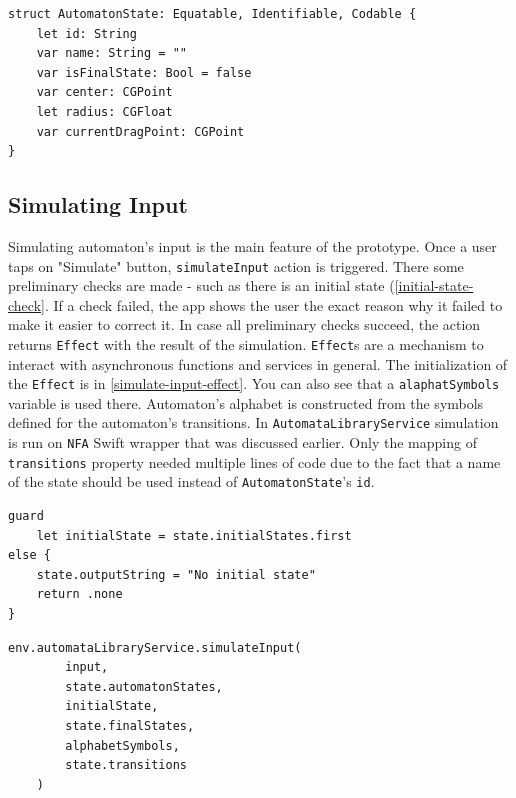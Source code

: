 \begin{lstlisting}[caption={State model}, label=state-model]
struct AutomatonState: Equatable, Identifiable, Codable {
    let id: String
    var name: String = ""
    var isFinalState: Bool = false
    var center: CGPoint
    let radius: CGFloat
    var currentDragPoint: CGPoint
}
\end{lstlisting}

\subsection{Simulating Input}

Simulating automaton's input is the main feature of the prototype. Once a user taps on "Simulate" button, \lstinline{simulateInput} action is triggered. There some preliminary checks are made - such as there is an initial state (\ref{initial-state-check}. If a check failed, the app shows the user the exact reason why it failed to make it easier to correct it. In case all preliminary checks succeed, the action returns \lstinline{Effect} with the result of the simulation. \lstinline{Effect}s are a mechanism to interact with asynchronous functions and services in general. The initialization of the \lstinline{Effect} is in \ref{simulate-input-effect}. You can also see that a \lstinline{alaphatSymbols} variable is used there. Automaton's alphabet is constructed from the symbols defined for the automaton's transitions. In \lstinline{AutomataLibraryService} simulation is run on \lstinline{NFA} Swift wrapper that was discussed earlier. Only the mapping of \lstinline{transitions} property needed multiple lines of code due to the fact that a name of the state should be used instead of \lstinline{AutomatonState}'s \lstinline{id}.

\begin{lstlisting}[caption={Check for initiail state}, label=initial-state-check]
guard
    let initialState = state.initialStates.first
else {
    state.outputString = "No initial state"
    return .none
}
\end{lstlisting}   

\begin{lstlisting}[caption={Effect for simulating input}, label=simulate-input-effect]
env.automataLibraryService.simulateInput(
        input,
        state.automatonStates,
        initialState,
        state.finalStates,
        alphabetSymbols,
        state.transitions
    )
\end{lstlisting}

